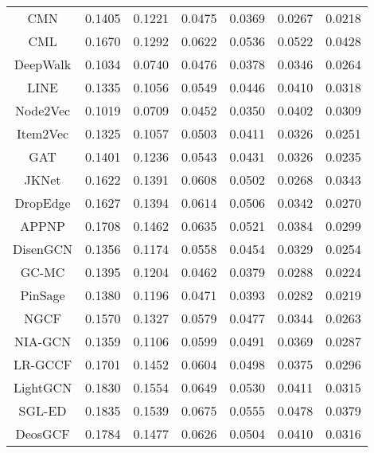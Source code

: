 \documentclass[sigconf,natbib=true]{acmart}
\begin{document}
\begin{table}[ht!]
\begin{tabular}{c cc cc cc}
        CMN                     & 0.1405 & 0.1221           & 0.0475 & 0.0369  & 0.0267 & 0.0218 \\
        CML                     & 0.1670 & 0.1292           & 0.0622 & 0.0536  & 0.0522 & 0.0428 \\\midrule
        DeepWalk                & 0.1034 & 0.0740           & 0.0476 & 0.0378  & 0.0346 & 0.0264 \\
        LINE                    & 0.1335 & 0.1056           & 0.0549 & 0.0446  & 0.0410 & 0.0318 \\
        Node2Vec                & 0.1019 & 0.0709           & 0.0452 & 0.0350  & 0.0402 & 0.0309 \\
        Item2Vec                & 0.1325 & 0.1057           & 0.0503 & 0.0411  & 0.0326 & 0.0251 \\\midrule
        GAT                     & 0.1401 & 0.1236           & 0.0543 & 0.0431  & 0.0326 & 0.0235 \\
        JKNet                   & 0.1622 & 0.1391           & 0.0608 & 0.0502  & 0.0268 & 0.0343 \\
        DropEdge                & 0.1627 & 0.1394           & 0.0614 & 0.0506  & 0.0342 & 0.0270 \\
        APPNP                   & 0.1708 & 0.1462           & 0.0635 & 0.0521  & 0.0384 & 0.0299 \\
        DisenGCN                & 0.1356 & 0.1174           & 0.0558 & 0.0454  & 0.0329 & 0.0254 \\\midrule
        GC-MC                   & 0.1395 & 0.1204           & 0.0462 & 0.0379  & 0.0288 & 0.0224 \\
        PinSage                 & 0.1380 & 0.1196           & 0.0471 & 0.0393  & 0.0282 & 0.0219 \\
        NGCF                    & 0.1570 & 0.1327           & 0.0579 & 0.0477  & 0.0344 & 0.0263 \\
        NIA-GCN                 & 0.1359 & 0.1106           & 0.0599 & 0.0491  & 0.0369 & 0.0287 \\
        LR-GCCF                 & 0.1701 & 0.1452           & 0.0604 & 0.0498  & 0.0375 & 0.0296 \\
        LightGCN                & 0.1830 & 0.1554           & 0.0649 & 0.0530  & 0.0411 & 0.0315 \\
        SGL-ED                  & 0.1835 & 0.1539           & 0.0675 & 0.0555  & 0.0478	& 0.0379 \\
        DeosGCF                 & 0.1784 & 0.1477           & 0.0626 & 0.0504  & 0.0410 & 0.0316 \\

\end{tabular}
\end{table}
\end{document}
